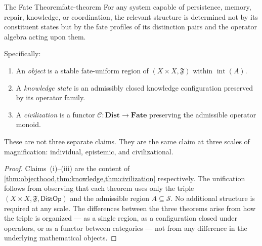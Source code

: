 \documentclass[12pt,twoside,openright]{book}
\newcommand{\fateMap}{\mathfrak{F}}
\newcommand{\fateSpace}{\mathcal{S}}
\newcommand{\distOp}{\mathsf{DistOp}}
\newcommand{\admRegion}{A}
\newcommand{\fateUnif}{\text{fate-uniform}}
\newcommand{\catDist}{\mathbf{Dist}}
\newcommand{\catFate}{\mathbf{Fate}}
\newcommand{\civFunc}{\mathcal{C}}
\providecommand{\admRegion}{A}
\providecommand{\fateUnif}{\text{fate-uniform}}
\providecommand{\catDist}{\mathbf{Dist}}
\providecommand{\catFate}{\mathbf{Fate}}
\providecommand{\civFunc}{\mathcal{C}}
\begin{document}
\begin{metatheorem}{The Fate Theorem}{fate-theorem}
For any system capable of persistence, memory, repair,
knowledge, or coordination, the relevant structure is
determined not by its constituent states but by the fate
profiles of its distinction pairs and the operator algebra
acting upon them.

Specifically:
\begin{enumerate}[nosep,label=(\roman*)]
  \item An \emph{object} is a stable $\fateUnif$ region of
    $(X\times X, \fateMap)$ within $\operatorname{int}(\admRegion)$.
  \item A \emph{knowledge state} is an admissibly closed
    knowledge configuration preserved by its operator family.
  \item A \emph{civilization} is a functor
    $\civFunc:\catDist\to\catFate$ preserving the admissible
    operator monoid.
\end{enumerate}
These are not three separate claims. They are the same claim
at three scales of magnification: individual, epistemic, and
civilizational.
\begin{proof}
Claims~(i)--(iii) are the content of
\cref{thm:objecthood,thm:knowledge,thm:civilization}
respectively. The unification follows from observing that each
theorem uses only the triple $(X\times X, \fateMap, \distOp)$
and the admissible region $\admRegion\subseteq\fateSpace$. No
additional structure is required at any scale. The differences
between the three theorems arise from how the triple is
organized --- as a single region, as a configuration closed
under operators, or as a functor between categories --- not
from any difference in the underlying mathematical objects.
\end{proof}
\end{metatheorem}
\end{document}

